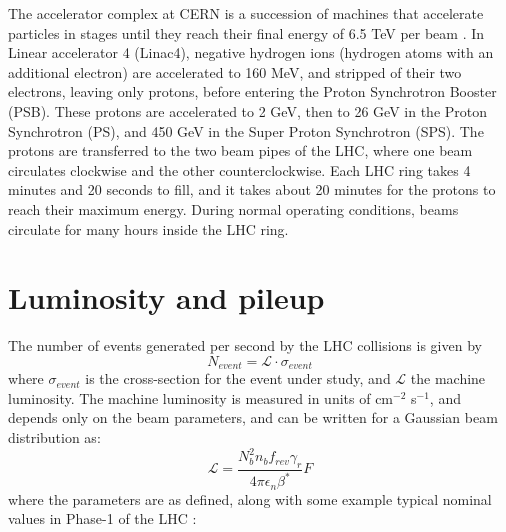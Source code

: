 The accelerator complex at CERN is a succession of machines that accelerate particles in stages until they reach their final energy of 6.5 TeV per beam \cite{CERN-OPEN-2000-148} \cite{Linac4-design-report-2020}. In Linear accelerator 4 (Linac4), negative hydrogen ions (hydrogen atoms with an additional electron) are accelerated to 160 MeV, and stripped of their two electrons, leaving only protons, before entering the Proton Synchrotron Booster (PSB). These protons are accelerated to 2 GeV, then to 26 GeV in the Proton Synchrotron (PS), and 450 GeV in the Super Proton Synchrotron (SPS). The protons are transferred to the two beam pipes of the LHC, where one beam circulates clockwise and the other counterclockwise. Each LHC ring takes 4 minutes and 20 seconds to fill, and it takes about 20 minutes for the protons to reach their maximum energy. During normal operating conditions, beams circulate for many hours inside the LHC ring.

\section{Luminosity and pileup}
The number of events generated per second by the LHC collisions is given by
\begin{equation}
     N_{event} = \mathcal{L} \cdot \sigma_{event}
    \label{eqn:nEvents}
\end{equation} 
where $\sigma_{event}$ is the cross-section for the event under study, and $\mathcal{L}$ the machine luminosity. The machine luminosity is measured in units of cm$^{-2}$ s$^{-1}$, and depends only on the beam parameters, and can be written for a Gaussian beam distribution as:
\begin{equation}
    \mathcal{L} = \frac{N_b^2 n_b f_{rev} \gamma_r}{4\pi \epsilon_n \beta^*} F
\end{equation}
where the parameters are as defined, along with some example typical nominal values in Phase-1 of the LHC \cite{CERN-luminosity-accelerator-school-article} \cite{ipac2012-proceedings}:

